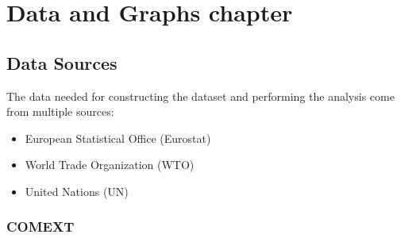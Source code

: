 \chapter{Data and Graphs chapter}

\section{Data Sources}

The data needed for constructing the dataset and performing the analysis come from multiple sources:
\begin{itemize}
    \item European Statistical Office (Eurostat) \cite{eurostat2022comext}
    \item World Trade Organization (WTO) \cite{wto2022stats}
    \item United Nations (UN) \cite{un2022population}
\end{itemize}

\subsection{COMEXT}

